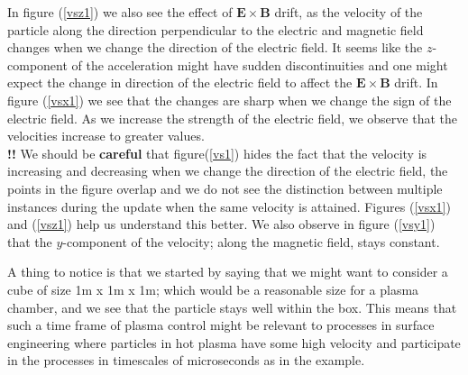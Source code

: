 \documentclass[12pt]{article}
\begin{document}
	In figure (\ref{vsz1}) we also see the effect of $\mathbf{E} \times \mathbf{B}$ drift, as the velocity of the particle along the direction perpendicular to the electric and magnetic field changes when we change the direction of the electric field. It seems like the $z$-component of the acceleration might have sudden discontinuities and one might expect the change in direction of the electric field  to affect the $\mathbf{E} \times \mathbf{B}$ drift. In figure (\ref{vsx1}) we see that the changes are sharp when we change the sign of the electric field. As we increase the strength of the electric field, we observe that the velocities increase to greater values. \\
	
	\noindent \textbf{!!} We should be \textbf{careful} that figure(\ref{vs1}) hides the fact that the velocity is increasing and decreasing when we change the direction of the electric field, the points in the figure overlap and we do not see the distinction between multiple instances during the update when the same velocity is attained. Figures (\ref{vsx1}) and (\ref{vsz1}) help us understand this better. We also observe in figure (\ref{vsy1}) that the $y$-component of the velocity; along the magnetic field, stays constant.
	
	A thing to notice is that we started by saying that we might want to consider a cube of size 1m x 1m x 1m; which would be a reasonable size for a plasma chamber, and we see that the particle stays well within the box. This means that such a time frame of plasma control might be relevant to processes in surface engineering where particles in hot plasma have some high velocity and participate in the processes in timescales of microseconds as in the example. 
\end{document}
